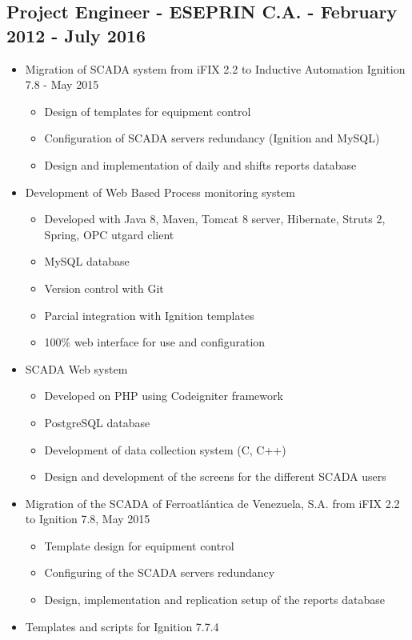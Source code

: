 \documentclass[letterpaper,11pt]{report}
\begin{document}
\subsection*{Project Engineer - ESEPRIN C.A. - February 2012 - July 2016}
  \begin{itemize}
    \item Migration of SCADA system from iFIX 2.2 to Inductive Automation Ignition 7.8 - May 2015
        \begin{itemize}
            \item Design of templates for equipment control
            \item Configuration of SCADA servers redundancy (Ignition and MySQL)
            \item Design and implementation of daily and shifts reports database
        \end{itemize}
    \item Development of Web Based Process monitoring system
        \begin{itemize}
        \item Developed with Java 8, Maven, Tomcat 8 server, Hibernate, Struts 2, Spring, OPC utgard client
        \item MySQL database
        \item Version control with Git
        \item Parcial integration with Ignition templates
        \item 100\% web interface for use and configuration
        \end{itemize}
    \item SCADA Web system
        \begin{itemize}
        \item Developed on PHP using Codeigniter framework
        \item PostgreSQL database
        \item Development of data collection system (C, C++)
        \item Design and development of the screens for the different SCADA users
        \end{itemize}
    \item Migration of the SCADA of Ferroatlántica de Venezuela, S.A. from iFIX 2.2 to Ignition 7.8, May 2015
        \begin{itemize}
            \item Template design for equipment control
            \item Configuring of the SCADA servers redundancy
            \item Design, implementation and replication setup of the reports database
        \end{itemize}
    \item Templates and scripts for Ignition 7.7.4
    

\end{itemize}
\end{document}
